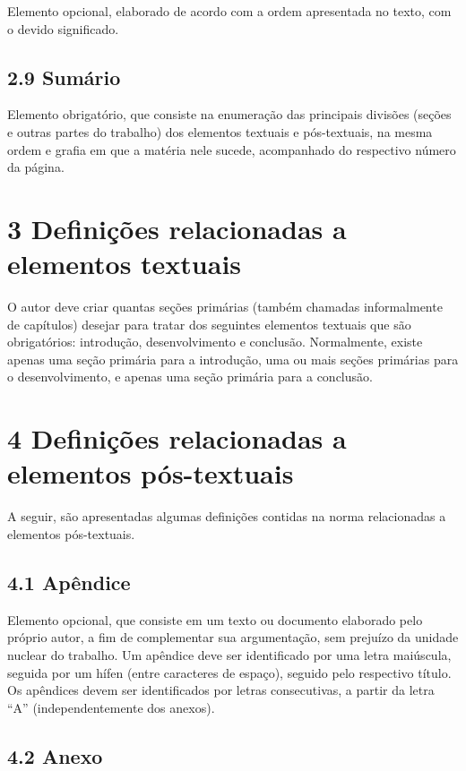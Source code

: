 \documentclass[
	12pt,				%
	oneside,			%
	a4paper,			%
	english,			%
	brazil				%
	]{abntex2ppgsi}
\begin{document}
\begin{anexosenv}
Elemento opcional, elaborado de acordo com a ordem apresentada no texto, com o devido significado.

\subsection*{2.9 Sumário}

Elemento obrigatório, que consiste na enumeração das principais divisões (seções e outras partes do trabalho) dos elementos textuais e pós-textuais, na mesma ordem e grafia em que a matéria nele sucede, acompanhado do respectivo número da página.

\section*{3 Definições relacionadas a elementos textuais}

O autor deve criar quantas seções primárias (também chamadas informalmente de capítulos) desejar para tratar dos seguintes elementos textuais que são obrigatórios: introdução, desenvolvimento e conclusão. Normalmente, existe apenas uma seção primária para a introdução, uma ou mais seções primárias para o desenvolvimento, e apenas uma seção primária para a conclusão.

\section*{4 Definições relacionadas a elementos pós-textuais}

A seguir, são apresentadas algumas definições contidas na norma relacionadas a elementos pós-textuais.

\subsection*{4.1 Apêndice}

Elemento opcional, que consiste em um texto ou documento elaborado pelo próprio autor, a fim de complementar sua argumentação, sem prejuízo da unidade nuclear do trabalho. Um apêndice deve ser identificado por uma letra maiúscula, seguida por um hífen (entre caracteres de espaço), seguido pelo respectivo título. Os apêndices devem ser identificados por letras consecutivas, a partir da letra ``A'' (independentemente dos anexos).

\subsection*{4.2 Anexo}


\end{anexosenv}
\end{document}
